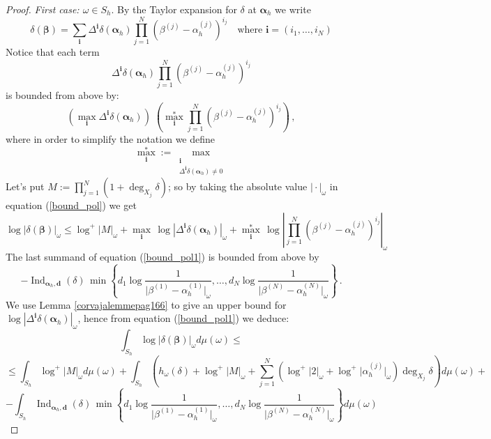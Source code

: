 \documentclass[10 pt,a4paper]{article}
\theoremstyle{plain}
\theoremstyle{definition}
\theoremstyle{named}
\DeclareMathOperator{\Ind}{Ind}
\begin{document}
\begin{proof}
{\emph{First case: $\omega\in S_h$}}.  By the Taylor expansion for $\delta$ at $\bm{\alpha}_h$ we write
\begin{equation}\label{bound_pol}
\delta(\bm{\beta})=\sum_{{\bm i}}\Delta^{{\bm i}}\delta(\bm{\alpha}_h)\prod_{j=1}^{N}(\beta^{(j)}- \alpha_{h}^{(j)})^{i_j}\quad \textrm{where }{\bm{i}}=(i_1,\ldots, i_N)
\end{equation}
Notice that each term 
$$
 \Delta^{{\bm i}}\delta(\bm{\alpha}_h)\prod_{j=1}^{N}(\beta^{(j)}- \alpha_{h}^{(j)})^{i_j}
$$
is bounded from above by:
$$
\left(\max_{\bm{i}}\Delta^{{\bm i}}\delta(\bm{\alpha}_h)\right)\;\left(\max^\ast_{\bm{i}}\prod_{j=1}^{N}(\beta^{(j)}- \alpha_{h}^{(j)})^{i_j}\right)\,,
$$
where  in order to simplify the notation we define
$$
\max^\ast_{\bm{i}}:=\max_{\substack {\bm{i}\\ \Delta^{{\bm i}}\delta(\bm{\alpha}_h)\neq 0}}
$$
Let's put $M:=\prod^N_{j=1} (1+\deg_{X_j}\delta)$; so by taking the absolute value $\vert\cdot\vert_{\omega}$ in equation (\ref{bound_pol}) we get
\begin{equation}\label{bound_pol1}
\log|\delta(\bm{\beta})|_{\omega}\le \log^+\vert M\vert_\omega+\max_{\bm i}\,\log \left\vert\Delta^{{\bm i}}\delta(\bm{\alpha}_h)\right\vert_\omega+\max^\ast_{\bm{i}}\,\log
\left\vert\prod_{j=1}^{N}(\beta^{(j)}- \alpha_{h}^{(j)})^{i_j}\right\vert_{\omega}
\end{equation}
 The last summand of equation (\ref{bound_pol1}) is bounded from above by
$$
-{\Ind}_{\bm{\alpha}_h, \bm{d}}(\delta)\,\min\left\{d_1\log\frac{1}{\vert\beta^{(1)}- \alpha_{h}^{(1)}\vert_\omega},\ldots , 
d_N\log\frac{1}{\vert\beta^{(N)}- \alpha_{h}^{(N)}\vert_\omega}\right\}\,.$$
We  use Lemma \ref{corvajalemmepag166} to give an upper bound for $\log \left\vert\Delta^{{\bm i}}\delta(\bm{\alpha}_h)\right\vert_\omega$, hence from equation (\ref{bound_pol1}) we  deduce:
$$
\int_{ S_h}\log\vert \delta(\bm{\beta})\vert_\omega d \mu(\omega)\leq
$$
$$
\leq \int_{S_h}\log^+\lvert M\vert_\omega d\mu(\omega)+ \int_{ S_h}\left(h_\omega(\delta)+\log^+ \lvert M\rvert_\omega+\sum_{j=1}^{N}(\log^+\vert 2\vert_\omega+\log^+\vert\alpha_{h}^{(j)} \vert_\omega)\deg_{X_j}\delta\right)d\mu(\omega) +
$$
$$
-\int_{ S_h}\Ind_{\bm{\alpha}_h, \bm{d}} (\delta)\,\min\left\{d_1\log\frac{1}{\vert\beta^{(1)}- \alpha_{h}^{(1)}\vert_\omega},\ldots , 
d_N\log\frac{1}{\vert\beta^{(N)}- \alpha_{h}^{(N)}\vert_\omega}\right\}d\mu(\omega)
$$


\end{proof}
\end{document}
